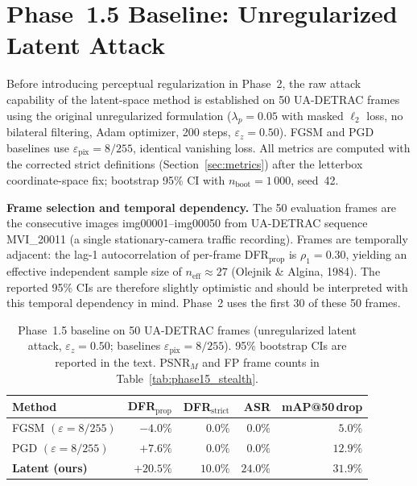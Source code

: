 \documentclass[12pt,a4paper]{report}
\begin{document}

\section{Phase~1.5 Baseline: Unregularized Latent Attack}
\label{sec:phase15_results}

Before introducing perceptual regularization in Phase~2, the raw attack
capability of the latent-space method is established on 50 UA-DETRAC frames
using the original unregularized formulation ($\lambda_p = 0.05$ with masked
$\ell_2$ loss, no bilateral filtering, Adam optimizer, 200 steps,
$\varepsilon_z = 0.50$). FGSM and PGD baselines use $\varepsilon_{\text{pix}} =
8/255$, identical vanishing loss. All metrics are computed with the corrected
strict definitions (Section~\ref{sec:metrics}) after the letterbox
coordinate-space fix; bootstrap 95\% CI with $n_{\text{boot}} = 1\,000$, seed~42.

\textbf{Frame selection and temporal dependency.}
The 50 evaluation frames are the consecutive images img00001--img00050 from
UA-DETRAC sequence MVI\_20011 (a single stationary-camera traffic recording).
Frames are temporally adjacent: the lag-1 autocorrelation of per-frame
DFR$_{\text{prop}}$ is $\rho_1 = 0.30$, yielding an effective independent
sample size of $n_{\text{eff}} \approx 27$ (Olejnik \& Algina, 1984).
The reported 95\% CIs are therefore slightly optimistic and should be
interpreted with this temporal dependency in mind.
Phase~2 uses the first 30 of these 50 frames.

\begin{table}[htbp]
  \centering
  \caption{Phase~1.5 baseline on 50 UA-DETRAC frames
           (unregularized latent attack, $\varepsilon_z{=}0.50$; baselines
           $\varepsilon_{\text{pix}}{=}8/255$). 95\% bootstrap CIs are
           reported in the text. PSNR$_M$ and FP frame counts in Table~\ref{tab:phase15_stealth}.}
  \label{tab:phase15_main}
  \small
  \begin{tabular}{@{}lrrrr@{}}
    \toprule
    \textbf{Method}
      & \textbf{DFR$_{\text{prop}}$}
      & \textbf{DFR$_{\text{strict}}$}
      & \textbf{ASR}
      & \textbf{mAP@50\,drop} \\
    \midrule
    FGSM $(\varepsilon{=}8/255)$
      & $-4.0\%$ & $0.0\%$ & $0.0\%$ & $5.0\%$ \\
    PGD  $(\varepsilon{=}8/255)$
      & $+7.6\%$ & $0.0\%$ & $0.0\%$ & $12.9\%$ \\
    \textbf{Latent (ours)}
      & $\mathbf{+20.5\%}$
      & $\mathbf{10.0\%}$
      & $\mathbf{24.0\%}$
      & $\mathbf{31.9\%}$ \\
    \bottomrule
  \end{tabular}

  \end{table}
\end{document}
